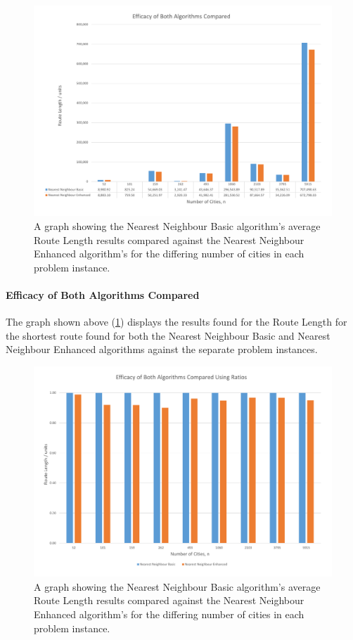 \documentclass[conference,backref=page]{acmsiggraph}
\begin{document}
\begin{figure}[h]
	\includegraphics[width=\textwidth]{images/efficacy_compared.pdf}
	\caption{A graph showing the Nearest Neighbour Basic algorithm's average Route Length results compared against the Nearest Neighbour Enhanced algorithm's for the differing number of cities in each problem instance.}
	\label{efficacycomparedgraph}
\end{figure}

\paragraph{Efficacy of Both Algorithms Compared}
The graph shown above (\ref{efficacycomparedgraph}) displays the results found for the Route Length for the shortest route found for both the Nearest Neighbour Basic and Nearest Neighbour Enhanced algorithms against the separate problem instances.

	
\begin{figure}[h]
	\includegraphics[width=\textwidth]{images/efficacy_compared_ratios.pdf}
	\caption{A graph showing the Nearest Neighbour Basic algorithm's average Route Length results compared against the Nearest Neighbour Enhanced algorithm's for the differing number of cities in each problem instance.}
	\label{efficacycomparedratiosgraph}
\end{figure}
\end{document}
